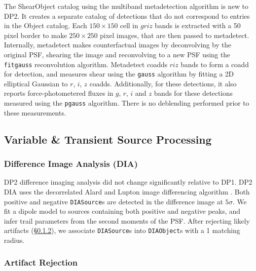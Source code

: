 The \gls{ShearObject} catalog using the multiband metadetection algorithm \citep[][]{2020ApJ...902..138S} is new to DP2.
It creates a separate catalog of detections that do not correspond to entries in the \gls{Object} catalog.
Each $150 \times 150$ cell in $griz$ bands is extracted with a 50 pixel border to make $250 \times 250$ pixel images, that are then passed to metadetect.
Internally, metadetect makes counterfactual images by deconvolving by the original \gls{PSF}, shearing the image and reconvolving to a new \gls{PSF} using the \texttt{fitgauss} reconvolution \gls{algorithm}.
Metadetect coadds $riz$ bands to form a coadd for detection, and measures shear using the \texttt{gauss} \gls{algorithm} by fitting a \gls{2D} elliptical Gaussian to $r$, $i$, $z$ coadds.
Additionally, for these detections, it also reports force-photometered fluxes in $g$, $r$, $i$ and $z$ bands for these detections measured using the \texttt{pgauss} \gls{algorithm}.
There is no deblending performed prior to these measurements.


\subsection{Variable \& Transient Source Processing} \label{sec:drp-variabletransient}

\subsubsection{Difference Image Analysis (DIA)} \label{sec:drp-variabletransient-dia}

\gls{DP2} difference imaging analysis did not change significantly relative to \gls{DP1}.
DP2 \gls{DIA} uses the decorrelated Alard and Lupton image differencing algorithm \citep[][]{1998ApJ...503..325A,DMTN-021}.
Both positive and negative \texttt{DIASource}s are detected in the difference image at $5\sigma$.
We fit a dipole model to sources containing both positive and negative peaks, and infer trail parameters from the second moments of the \gls{PSF}.
After rejecting likely artifacts (\S \ref{sec:drp-variabletransient-artifact}), we associate  \texttt{DIASource}s into \texttt{DIAObject}s with a 1 matching radius.

\subsubsection{Artifact Rejection} \label{sec:drp-variabletransient-artifact}

